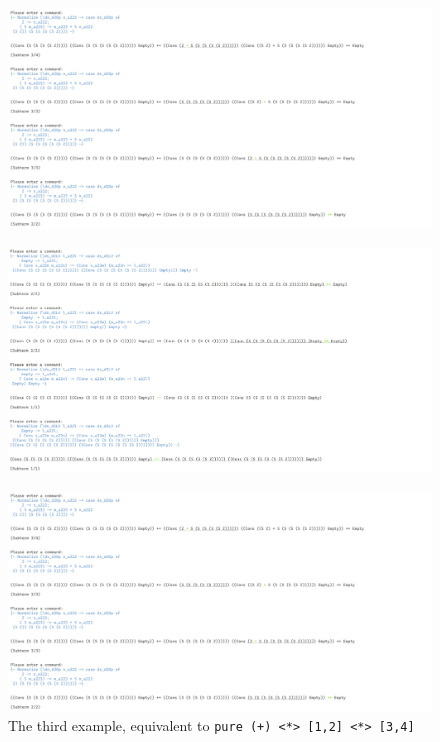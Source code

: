 \begin{figure}
    \includegraphics[width=1\textwidth]{resources/applicative_part_7.PNG}
\end{figure}
\begin{figure}
    \includegraphics[width=1\textwidth]{resources/applicative_part_8.PNG}
\end{figure}
\begin{figure}
    \includegraphics[width=1\textwidth]{resources/applicative_part_7.PNG}
    \caption{The third example, equivalent to \texttt{pure (+) <*> [1,2] <*> [3,4]}}
\end{figure}


